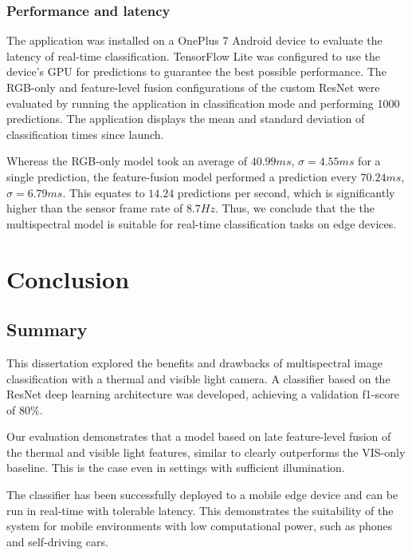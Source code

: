 \documentclass{l4proj}
\begin{document}
\subsection{Performance and latency}

The application was installed on a OnePlus 7 Android device to evaluate the latency of real-time classification. TensorFlow Lite was configured to use the device's GPU for predictions to guarantee the best possible performance. The RGB-only and feature-level fusion configurations of the custom ResNet were evaluated by running the application in classification mode and performing 1000 predictions. The application displays the mean and standard deviation of classification times since launch. 

Whereas the RGB-only model took an average of $40.99 ms$, $\sigma = 4.55 ms$ for a single prediction, the feature-fusion model performed a prediction every $70.24 ms$, $\sigma = 6.79 ms$. This equates to $14.24$ predictions per second, which is significantly higher than the sensor frame rate of $8.7 Hz$. Thus, we conclude that the the multispectral model is suitable for real-time classification tasks on edge devices.

\chapter{Conclusion}

\section{Summary}

This dissertation explored the benefits and drawbacks of multispectral image classification with a thermal and visible light camera. A classifier based on the ResNet deep learning architecture was developed, achieving a validation f1-score of $80\%$.

Our evaluation demonstrates that a model based on late feature-level fusion of the thermal and visible light features, similar to \citet{wagner_multispectral_2016} clearly outperforms the VIS-only baseline. This is the case even in settings with sufficient illumination.

The classifier has been successfully deployed to a mobile edge device and can be run in real-time with tolerable latency. This demonstrates the suitability of the system for mobile environments with low computational power, such as phones and self-driving cars.
\end{document}
